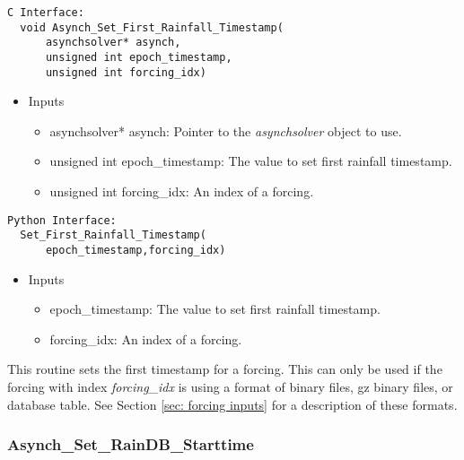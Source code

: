 \documentclass[12pt]{article}
\begin{document}
\begin{lstlisting}[style=CStyle]
  C Interface:
  void Asynch_Set_First_Rainfall_Timestamp(
      asynchsolver* asynch,
      unsigned int epoch_timestamp,
      unsigned int forcing_idx)
\end{lstlisting}
\begin{itemize}
 \item Inputs
  \begin{itemize}
   \item asynchsolver* asynch: Pointer to the \emph{asynchsolver} object to use.
   \item unsigned int epoch\_timestamp: The value to set first rainfall timestamp.
   \item unsigned int forcing\_idx: An index of a forcing.
  \end{itemize}
\end{itemize}
\begin{lstlisting}[style=PythonStyle]
  Python Interface:
  Set_First_Rainfall_Timestamp(
      epoch_timestamp,forcing_idx)
\end{lstlisting}
\begin{itemize}
 \item Inputs
  \begin{itemize}
   \item epoch\_timestamp: The value to set first rainfall timestamp.
   \item forcing\_idx: An index of a forcing.
  \end{itemize}
\end{itemize}
This routine sets the first timestamp for a forcing. This can only be used if the forcing with index \emph{forcing\_idx} is using a format of binary files, gz binary files, or database table. See Section \ref{sec: forcing inputs} for a description of these formats.


\subsubsection{Asynch\_Set\_RainDB\_Starttime} \label{sec: asynch_set_raindb_starttime}
\end{document}
